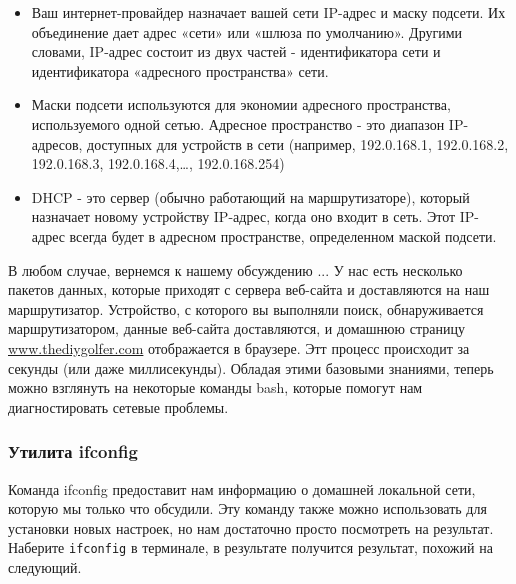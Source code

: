 \documentclass{report}
\begin{document}
\begin{itemize}
\tightlist
\item
  Ваш интернет-провайдер назначает вашей сети IP-адрес и маску подсети.
  Их объединение дает адрес «сети» или «шлюза по умолчанию». Другими
  словами, IP-адрес состоит из двух частей - идентификатора сети и
  идентификатора «адресного пространства» сети.
\item
  Маски подсети используются для экономии адресного пространства,
  используемого одной сетью. Адресное пространство - это диапазон
  IP-адресов, доступных для устройств в сети (например, 192.0.168.1,
  192.0.168.2, 192.0.168.3, 192.0.168.4,\ldots, 192.0.168.254)
\item
  DHCP - это сервер (обычно работающий на маршрутизаторе), который
  назначает новому устройству IP-адрес, когда оно входит в сеть. Этот
  IP-адрес всегда будет в адресном пространстве, определенном маской
  подсети.
\end{itemize}

В любом случае, вернемся к нашему обсуждению ... У нас есть несколько
пакетов данных, которые приходят с сервера веб-сайта и доставляются на
наш маршрутизатор. Устройство, с которого вы выполняли поиск,
обнаруживается маршрутизатором, данные веб-сайта доставляются, и
домашнюю страницу
\href{http://www.thediygolfer.com}{www.thediygolfer.com} отображается в
браузере. Этт процесс происходит за секунды (или даже миллисекунды).
Обладая этими базовыми знаниями, теперь можно взглянуть на некоторые
команды bash, которые помогут нам диагностировать сетевые проблемы.

\hypertarget{ifconfig}{%
\subsubsection{\texorpdfstring{\protect\hyperlink{ifconfig}{}Утилита
ifconfig}{Утилита ifconfig}}\label{ifconfig}}

Команда ifconfig предоставит нам информацию о домашней локальной сети,
которую мы только что обсудили. Эту команду также можно использовать для
установки новых настроек, но нам достаточно просто посмотреть на
результат. Наберите \texttt{ifconfig} в терминале, в результате
получится результат, похожий на следующий.
\end{document}
